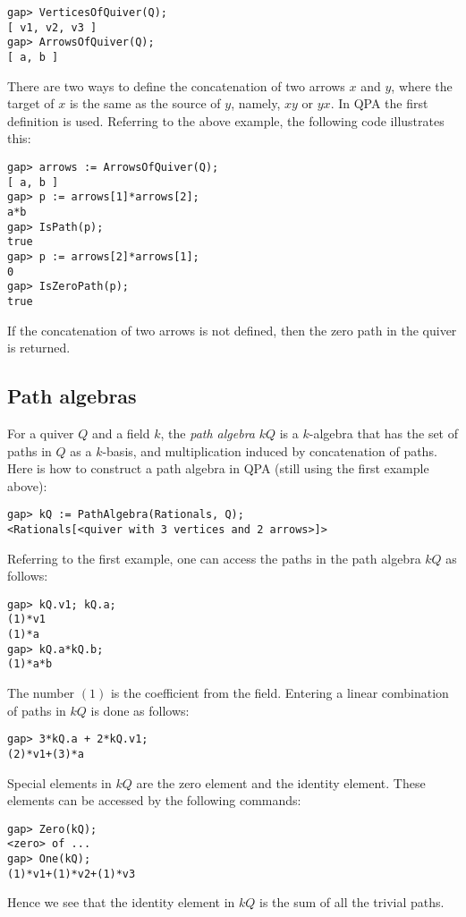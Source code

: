 \documentclass{amsart}
\theoremstyle{definition}
\theoremstyle{theoretic}
\begin{document}
\begin{verbatim}
gap> VerticesOfQuiver(Q);
[ v1, v2, v3 ]
gap> ArrowsOfQuiver(Q);
[ a, b ]
\end{verbatim}
There are two ways to define the concatenation of two arrows $x$ and
$y$, where the target of $x$ is the same as the source of $y$, namely,
$xy$ or $yx$.  In QPA the first definition is used.  Referring to the
above example, the following code illustrates this:
\begin{verbatim}
gap> arrows := ArrowsOfQuiver(Q);
[ a, b ]
gap> p := arrows[1]*arrows[2];
a*b
gap> IsPath(p);
true
gap> p := arrows[2]*arrows[1];
0
gap> IsZeroPath(p);
true
\end{verbatim}
If the concatenation of two arrows is not defined, then the zero path
in the quiver is returned.  

\subsection{Path algebras} %

For a quiver $Q$ and a field $k$, the \emph{path algebra} $kQ$ is a
$k$-algebra that has the set of paths in $Q$ as a $k$-basis, and
multiplication induced by concatenation of paths.  Here is
how to construct a path algebra in QPA (still using the first example
above): 
\begin{verbatim}
gap> kQ := PathAlgebra(Rationals, Q);
<Rationals[<quiver with 3 vertices and 2 arrows>]>
\end{verbatim}
Referring to the first example, one can access the paths in the path
algebra $kQ$ as follows:
\begin{verbatim}
gap> kQ.v1; kQ.a; 
(1)*v1
(1)*a
gap> kQ.a*kQ.b;
(1)*a*b
\end{verbatim}
The number $(1)$ is the coefficient from the field.  Entering a linear
combination of paths in $kQ$ is done as follows:
\begin{verbatim}
gap> 3*kQ.a + 2*kQ.v1;
(2)*v1+(3)*a
\end{verbatim} 
Special elements in $kQ$ are the zero element and the identity
element.  These elements can be accessed by the following commands:
\begin{verbatim}
gap> Zero(kQ);
<zero> of ...
gap> One(kQ);
(1)*v1+(1)*v2+(1)*v3
\end{verbatim}
Hence we see that the identity element in $kQ$ is the sum of all the
trivial paths. 
\end{document}
